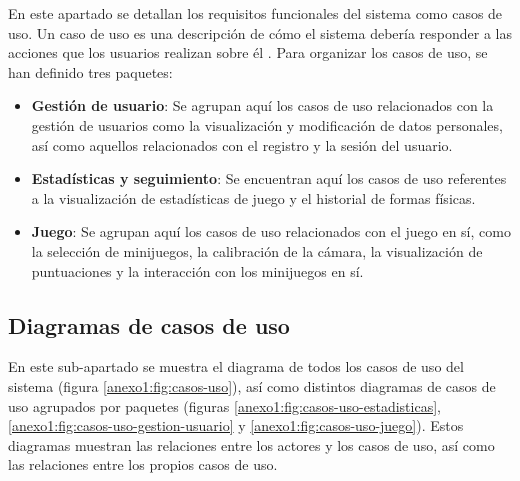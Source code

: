 En este apartado se detallan los requisitos funcionales del sistema como casos de uso. Un caso de
uso es una descripción de cómo el sistema debería responder a las acciones que los usuarios realizan
sobre él \parencite{TIWARI2015128}. Para organizar los casos de uso, se han definido tres paquetes:
\begin{itemize}
    \item \textbf{Gestión de usuario}: Se agrupan aquí los casos de uso relacionados con la
           gestión de usuarios como la visualización y modificación de datos personales, así como
           aquellos relacionados con el registro y la sesión del usuario.

    \item \textbf{Estadísticas y seguimiento}: Se encuentran aquí los casos de uso referentes a la
           visualización de estadísticas de juego y el historial de formas físicas.

    \item \textbf{Juego}: Se agrupan aquí los casos de uso relacionados con el juego en sí, como la
           selección de minijuegos, la calibración de la cámara, la visualización de puntuaciones y
           la interacción con los minijuegos en sí.
\end{itemize}

\subsection{Diagramas de casos de uso}
\label{anexo1:sec:requisitos-funcionales-casos-de-uso}
En este sub-apartado se muestra el diagrama de todos los casos de uso del sistema (figura
\ref{anexo1:fig:casos-uso}), así como distintos diagramas de casos de uso agrupados por paquetes
(figuras \ref{anexo1:fig:casos-uso-estadisticas}, \ref{anexo1:fig:casos-uso-gestion-usuario} y
\ref{anexo1:fig:casos-uso-juego}). Estos diagramas muestran las relaciones entre los actores y los
casos de uso, así como las relaciones entre los propios casos de uso.





